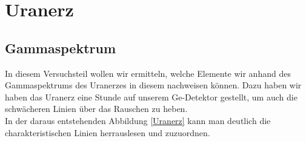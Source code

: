 \section{Uranerz}

\subsection{Gammaspektrum}

In diesem Versuchsteil wollen wir ermitteln, welche Elemente wir anhand des Gammaspektrums des Uranerzes in diesem nachweisen können. Dazu haben 
wir haben das Uranerz eine Stunde auf unserem Ge-Detektor gestellt, um auch die schwächeren Linien über das Rauschen zu heben.\\
In der daraus entstehenden Abbildung \ref{Uranerz} kann man deutlich die charakteristischen Linien herrauslesen und zuzuordnen\footnotemark.

